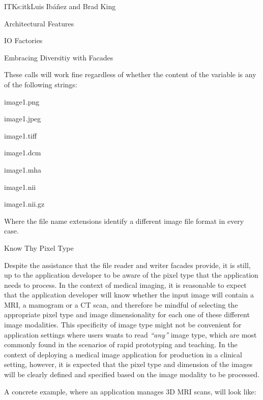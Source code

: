 \begin{aosachapter}{ITK}{s:itk}{Luis Ib\'{a}\~{n}ez and Brad King}
\begin{aosasect1}{Architectural Features}
\begin{aosasect2}{IO Factories}
\begin{aosasect3}{Embracing Diversitiy with Facades}
\begin{aosaitemize}
\item {}
\item {}
\item {}
\end{aosaitemize}

These calls will work fine regardless of whether the content of the
 variable is any of the following strings:

\begin{aosaitemize}
\item image1.png
\item image1.jpeg
\item image1.tiff
\item image1.dcm
\item image1.mha
\item image1.nii
\item image1.nii.gz
\end{aosaitemize}

Where the file name extensions identify a different image file
format in every case.

\end{aosasect3}

\begin{aosasect3}{Know Thy Pixel Type}

Despite the assistance that the file reader and writer facades provide, it is
still, up to the application developer to be aware of the pixel type that the
application needs to process. In the context of medical imaging, it is
reasonable to expect that the application developer will know whether the input
image will contain a MRI, a mamogram or a CT scan, and therefore be mindful of
selecting the appropriate pixel type and image dimensionality for each one of
these different image modalities. This specificity of image type might not be
convenient for application settings where users wants to read \emph{``any''}
image type, which are most commonly found in the scenarios of rapid prototyping
and teaching.  In the context of deploying a medical image application for
production in a clinical setting, however, it is expected that the pixel type
and dimension of the images will be clearly defined and specified based on the
image modality to be processed.

A concrete example, where an application manages 3D MRI scans, will look like:


\end{aosasect3}
\end{aosasect2}
\end{aosasect1}
\end{aosachapter}
